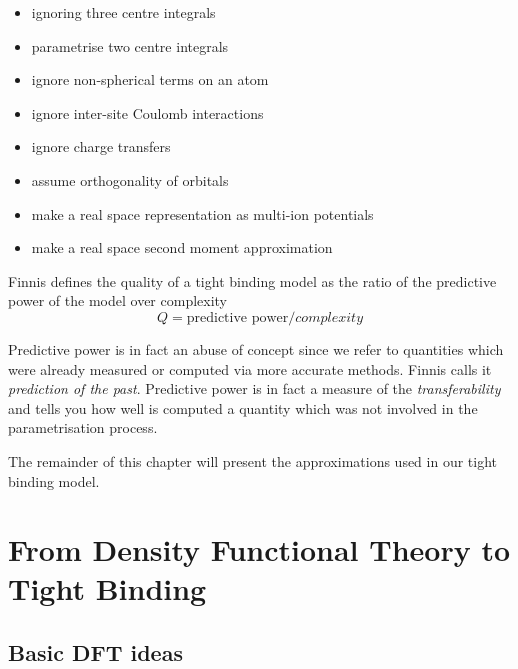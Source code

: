 \begin{itemize}
  \item{ignoring three centre integrals}
  \item{parametrise two centre integrals}
  \item{ignore non-spherical terms on an atom}
  \item{ignore inter-site Coulomb interactions}
  \item{ignore charge transfers}
  \item{assume orthogonality of orbitals}
  \item{make a real space representation as multi-ion potentials}
  \item{make a real space second moment approximation}
\end{itemize}
\par{Finnis \citep{Finnis03} defines the quality of a tight binding model as the ratio of the predictive power of the model over complexity}
\begin{equation*}
 Q=\textrm{predictive power}/complexity
\end{equation*}
\par{Predictive power is in fact an abuse of concept since we refer to quantities which were already measured or computed via more accurate methods. Finnis \citep{Finnis03} calls it \emph{prediction of the past}. Predictive power is in fact a measure of the \emph{transferability} and tells you how well is computed a quantity which was not involved in the parametrisation process.}
\par{The remainder of this chapter will present the approximations used in our tight binding model.}
\section{From Density Functional Theory to Tight Binding}
\subsection{Basic DFT ideas}
